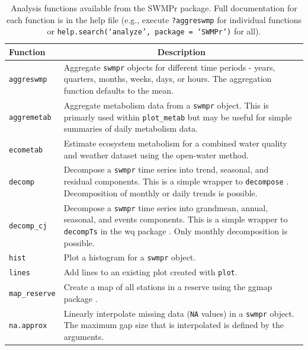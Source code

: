 \begin{table}[!tbp]
\caption{Analysis functions available from the SWMPr package.  Full documentation for each function is in the help file (e.g., execute \texttt{?aggreswmp} for individual functions or \texttt{help.search(`analyze', package = `SWMPr')} for all).\label{tab:analyze}} 
\begin{center}
\begin{tabular}{lp{3.5in}}
\hline\hline
\multicolumn{1}{l}{Function}&\multicolumn{1}{c}{Description}\tabularnewline
\hline
\texttt{aggreswmp}&Aggregate \texttt{swmpr} objects for different time periods - years, quarters, months,  weeks, days, or hours.  The aggregation function defaults to the mean.\tabularnewline
\texttt{aggremetab}&Aggregate metabolism data from a \texttt{swmpr} object.  This is primarly used within \texttt{plot\_metab} but may be useful for simple summaries of daily metabolism data.\tabularnewline
\texttt{ecometab}&Estimate ecosystem metabolism for a combined water quality and weather dataset using the open-water method.\tabularnewline
\texttt{decomp}&Decompose a \texttt{swmpr} time series into trend, seasonal, and residual components.  This is a simple wrapper to \texttt{decompose} \cite{Kendall83}.  Decomposition of monthly or daily trends is possible.\tabularnewline
\texttt{decomp\_cj}&Decompose a \texttt{swmpr} time series into grandmean, annual, seasonal, and events components.  This is a simple wrapper to \texttt{decompTs} in the wq package \cite{Jassby14}.  Only monthly decomposition is possible.\tabularnewline
\texttt{hist}&Plot a histogram for a \texttt{swmpr} object.\tabularnewline
\texttt{lines}&Add lines to an existing plot created with \texttt{plot}.\tabularnewline
\texttt{map\_reserve}&Create a map of all stations in a reserve using the ggmap package \cite{Kahle13}.\tabularnewline
\texttt{na.approx}&Linearly interpolate missing data (\texttt{NA} values) in a \texttt{swmpr} object. The maximum gap size that is interpolated is defined by the arguments.\tabularnewline

\end{tabular}
\end{center}
\end{table}
